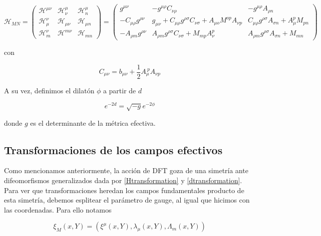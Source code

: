\documentclass{article}
\numberwithin{equation}{section}
\begin{document}
\begin{equation}\label{HKK}
\mathcal{H}_{MN}=
\begin{pmatrix}
\mathcal{H}^{\mu \nu} & \mathcal{H}^{\mu}_{\nu} & \mathcal{H}^{\mu}_n\\
\mathcal{H}_{\mu}^{\nu} & \mathcal{H}_{\mu \nu} & \mathcal{H}_{\mu n}\\
\mathcal{H}_{m}^{\nu} & \mathcal{H}^{m \nu} & \mathcal{H}_{m n} 
\end{pmatrix}
=
\begin{pmatrix}
g^{\mu \nu} & -g^{\mu \rho} C_{\nu \rho} & -g^{\mu \rho} A_{\rho n}\\
-C_{\mu \rho}g^{\rho \nu }  & g_{\mu \nu} + C_{\mu \rho}g^{\rho \sigma } C_{\nu \sigma} + A_{\mu o} M^{o p} A_{\nu p}  &  C_{\mu \rho}g^{\rho \sigma } A_{\sigma n} + A_{\mu}^p M_{p n} \\
-A_{\rho m}g^{\rho \nu } & A_{\rho m} g^{\rho \sigma} C_{\nu \sigma} + M_{m p} A_{\nu}^p  &  A_{\rho m}g^{\rho \sigma } A_{\sigma n} + M_{m n}
\end{pmatrix}
\end{equation}

con

\begin{equation}
C_{\mu \nu} = b_{\mu \nu} + \frac{1}{2} A_{\mu}^{\ p} A_{\nu p}
\end{equation}

A su vez, definimos el dilatón $ \phi $ a partir de $ d $

\begin{equation}\label{dKK}
e^{-2 d} = \sqrt{-g}e^{-2 \phi}
\end{equation}

donde $ g $ es el determinante de la métrica efectiva.

\subsection{Transformaciones de los campos efectivos}\label{sec_transformaciones}

Como mencionamos anteriormente, la acción de DFT goza de una simetría ante difeomorfismos generalizados dada por \ref{Htransformation} y \ref{dtransformation}. Para ver que transformaciones heredan los campos fundamentales producto de esta simetría, debemos esplitear el parámetro de gauge, al igual que hicimos con las coordenadas. Para ello notamos

\begin{equation}\label{parametros}
\xi_M(x,Y)=(\xi^{\mu}(x,Y), \lambda_{\mu}(x,Y), \Lambda_m(x,Y))
\end{equation}
\end{document}
